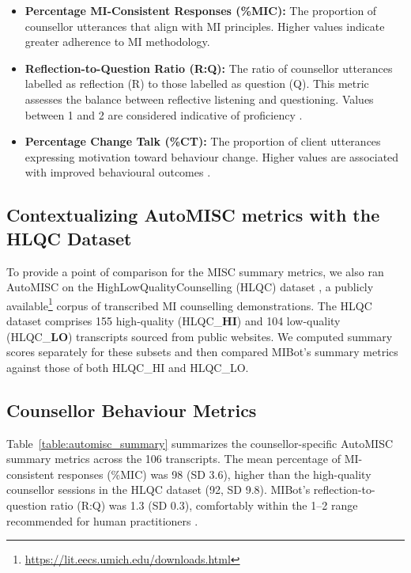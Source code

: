 \begin{itemize}

    \item \textbf{Percentage MI-Consistent Responses (\%MIC):} The proportion of counsellor utterances that align with MI principles. Higher values indicate greater adherence to MI methodology.
    
    \item \textbf{Reflection-to-Question Ratio (R:Q):} The ratio of counsellor utterances labelled as reflection (R) to those labelled as question (Q). This metric assesses the balance between reflective listening and questioning. Values between 1 and 2 are considered indicative of proficiency \citep{moyers2016}.

    \item \textbf{Percentage Change Talk (\%CT):} The proportion of client utterances expressing motivation toward behaviour change. Higher values are associated with improved behavioural outcomes \citep{apodaca2009}.
\end{itemize}

\subsection{Contextualizing AutoMISC metrics with the HLQC Dataset}
To provide a point of comparison for the MISC summary metrics, we also ran AutoMISC on the HighLowQualityCounselling (HLQC) dataset  \cite{perez-rosas-etal-2019-makes}, a publicly available\footnote{ \url{https://lit.eecs.umich.edu/downloads.html}} corpus of transcribed MI counselling demonstrations. The HLQC dataset comprises 155 high-quality (HLQC\_\textbf{HI}) and 104 low-quality (HLQC\_\textbf{LO}) transcripts sourced from public websites.
We computed summary scores separately for these subsets and then compared MIBot's summary metrics against those of both HLQC\_HI and HLQC\_LO.

\subsection{Counsellor Behaviour Metrics}
Table~\ref{table:automisc_summary} summarizes the counsellor-specific AutoMISC summary metrics across the 106 transcripts. The mean percentage of MI-consistent responses (\%MIC) was 98 (SD 3.6), higher than the high-quality counsellor sessions in the HLQC dataset (92, SD 9.8). MIBot's reflection-to-question ratio (R:Q) was 1.3 (SD 0.3), comfortably within the 1--2 range recommended for human practitioners \cite{moyers2016miti}.

